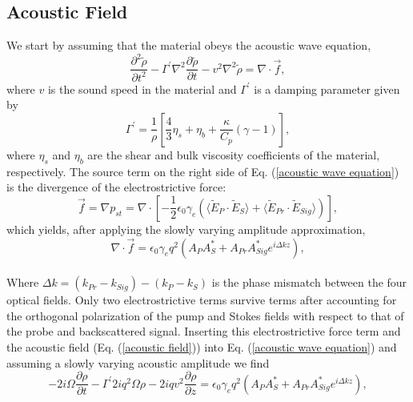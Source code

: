 \documentclass[sn-nature]{sn-jnl}%
\begin{document}
\subsection{Acoustic Field}
We start by assuming that the material obeys the acoustic wave equation,
\begin{equation}
    \frac{\partial^{2}\tilde{\rho}}{\partial t^{2}} - \Gamma^{\prime}\nabla^{2}\frac{\partial\tilde{\rho}}{\partial t} - v^{2}\nabla^{2}\tilde{\rho} = \nabla\cdot\vec{f},
    \label{acoustic wave equation}
\end{equation}
\noindent where $v$ is the sound speed in the material and $\Gamma^{\prime}$ is a damping parameter given by
\begin{equation}
    \Gamma^{\prime} = \frac{1}{\rho}\left[\frac{4}{3}\eta_{s} + \eta_{b} + \frac{\kappa}{C_{p}}(\gamma - 1)\right],
\end{equation}
\noindent where $\eta_{s}$ and $\eta_{b}$ are the shear and bulk viscosity coefficients of the material, respectively. The source term on the right side of Eq. (\ref{acoustic wave equation}) is the divergence of the electrostrictive force:
\begin{equation}
    \vec{f} = \nabla p_{st} = \nabla \cdot \left[-\frac{1}{2}\epsilon_{0}\gamma_{e}\left(\langle\tilde{E}_{P} \cdot \tilde{E}_{S}\rangle + \langle\tilde{E}_{Pr} \cdot \tilde{E}_{Sig}\rangle\right)\right],
\end{equation}
which yields, after applying the slowly varying amplitude approximation,
\begin{equation}
    \nabla\cdot\vec{f} = \epsilon_{0}\gamma_{e}q^{2}(A_{P}A_{S}^{*} + A_{Pr}A_{Sig}^{*}e^{i\Delta kz}),
\end{equation}
\\
Where $\Delta k = (k_{Pr} - k_{Sig}) - (k_{P} - k_{S})$ is the phase mismatch between the four optical fields. Only two electrostrictive terms survive terms after accounting for the orthogonal polarization of the pump and Stokes fields with respect to that of the probe and backscattered signal. Inserting this electrostrictive force term and the acoustic field (Eq. (\ref{acoustic field})) into Eq. (\ref{acoustic wave equation}) and assuming a slowly varying acoustic amplitude we find
\begin{equation}
    -2i\Omega\frac{\partial\rho}{\partial t} - \Gamma^{\prime}2iq^{2}\Omega\rho - 2iqv^{2}\frac{\partial\rho}{\partial z} = \epsilon_{0}\gamma_{e}q^{2}(A_{P}A_{S}^{*} + A_{Pr}A_{Sig}^{*}e^{i\Delta kz}),
\end{equation}
\end{document}
